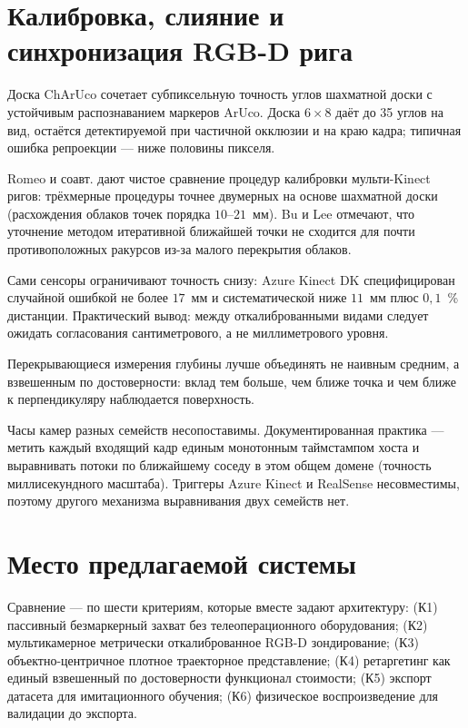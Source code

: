 \documentclass[12pt, a4paper, oneside]{report}
\begin{document}
\section{Калибровка, слияние и синхронизация RGB-D рига}

Доска ChArUco сочетает субпиксельную точность углов шахматной доски с устойчивым
распознаванием маркеров ArUco. Доска $6\times8$ даёт до 35 углов на вид, остаётся
детектируемой при частичной окклюзии и на краю кадра; типичная ошибка репроекции
--- ниже половины пикселя.

Romeo и соавт. дают чистое сравнение процедур калибровки мульти-Kinect ригов:
трёхмерные процедуры точнее двумерных на основе шахматной доски (расхождения
облаков точек порядка $10$--$21$~мм). Bu и Lee отмечают, что уточнение методом
итеративной ближайшей точки не сходится для почти противоположных ракурсов из-за
малого перекрытия облаков.

Сами сенсоры ограничивают точность снизу: Azure Kinect DK специфицирован
случайной ошибкой не более $17$~мм и систематической ниже $11$~мм плюс
$0{,}1$~\% дистанции. Практический вывод: между откалиброванными видами следует
ожидать согласования сантиметрового, а не миллиметрового уровня.

Перекрывающиеся измерения глубины лучше объединять не наивным средним, а
взвешенным по достоверности: вклад тем больше, чем ближе точка и чем ближе к
перпендикуляру наблюдается поверхность.

Часы камер разных семейств несопоставимы. Документированная практика --- метить
каждый входящий кадр единым монотонным таймстампом хоста и выравнивать потоки по
ближайшему соседу в этом общем домене (точность миллисекундного масштаба).
Триггеры Azure Kinect и RealSense несовместимы, поэтому другого механизма
выравнивания двух семейств нет.

\section{Место предлагаемой системы}

Сравнение --- по шести критериям, которые вместе задают архитектуру: (К1)
пассивный безмаркерный захват без телеоперационного оборудования; (К2)
мультикамерное метрически откалиброванное RGB-D зондирование; (К3)
объектно-центричное плотное траекторное представление; (К4) ретаргетинг как
единый взвешенный по достоверности функционал стоимости; (К5) экспорт датасета для
имитационного обучения; (К6) физическое воспроизведение для валидации до экспорта.
\end{document}
